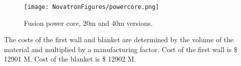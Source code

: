 



\begin{figure}[h!]
    \centering
    \texttt{[image: NovatronFigures/powercore.png]}
    \caption{ Fusion power core, 20m and 40m versions.}
    \label{fig:cad}
\end{figure}

The costs of the first wall and blanket are determined by the volume of the material and multiplied by a manufacturing factor.   Cost of the first wall is \$ 12901 M.  Cost of the blanket is \$ 12902 M.

